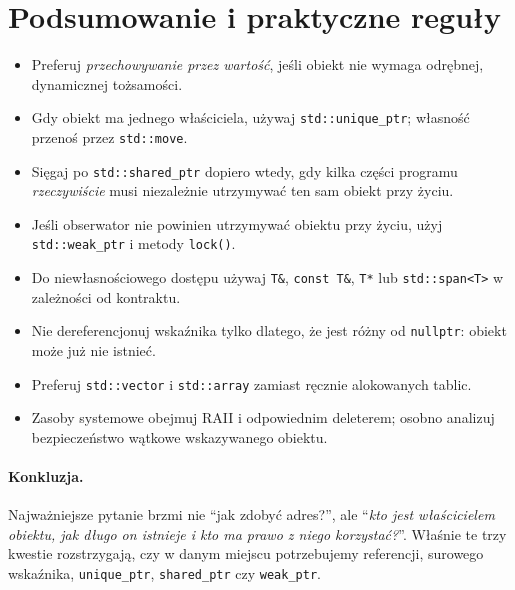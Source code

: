 \section{Podsumowanie i praktyczne reguły}

\begin{itemize}
    \item Preferuj \emph{przechowywanie przez wartość}, jeśli
    obiekt nie wymaga odrębnej, dynamicznej tożsamości.
    \item Gdy obiekt ma jednego właściciela, używaj
    \texttt{std::unique\_ptr}; własność przenoś przez
    \texttt{std::move}.
    \item Sięgaj po \texttt{std::shared\_ptr} dopiero wtedy,
    gdy kilka części programu \emph{rzeczywiście} musi niezależnie
    utrzymywać ten sam obiekt przy życiu.
    \item Jeśli obserwator nie powinien utrzymywać obiektu przy życiu,
    użyj \texttt{std::weak\_ptr} i metody \texttt{lock()}.
    \item Do niewłasnościowego dostępu używaj
    \texttt{T\&}, \texttt{const T\&}, \texttt{T*} lub
    \texttt{std::span<T>} w zależności od kontraktu.
    \item Nie dereferencjonuj wskaźnika tylko dlatego, że jest
    różny od \texttt{nullptr}: obiekt może już nie istnieć.
    \item Preferuj \texttt{std::vector} i \texttt{std::array}
    zamiast ręcznie alokowanych tablic.
    \item Zasoby systemowe obejmuj RAII i odpowiednim deleterem;
    osobno analizuj bezpieczeństwo wątkowe wskazywanego obiektu.
\end{itemize}

\paragraph{Konkluzja.}
Najważniejsze pytanie brzmi nie ``jak zdobyć adres?'', ale
``\emph{kto jest właścicielem obiektu, jak długo on istnieje
i kto ma prawo z niego korzystać?}''. Właśnie te trzy kwestie
rozstrzygają, czy w danym miejscu potrzebujemy referencji,
surowego wskaźnika, \texttt{unique\_ptr}, \texttt{shared\_ptr}
czy \texttt{weak\_ptr}.

